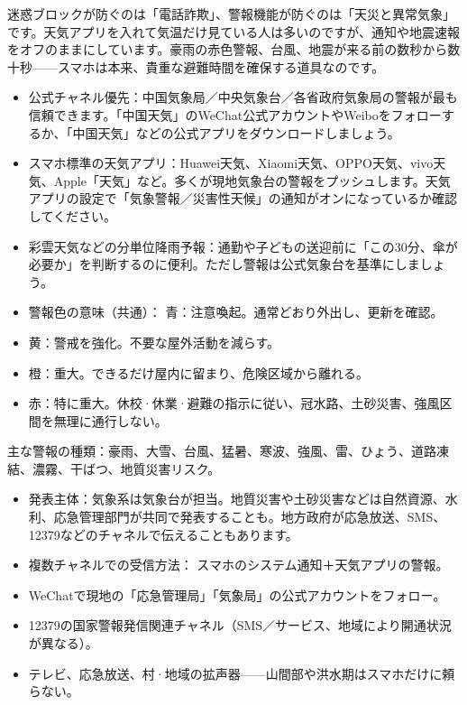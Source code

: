 
迷惑ブロックが防ぐのは「電話詐欺」、警報機能が防ぐのは「天災と異常気象」です。天気アプリを入れて気温だけ見ている人は多いのですが、通知や地震速報をオフのままにしています。豪雨の赤色警報、台風、地震が来る前の数秒から数十秒——スマホは本来、貴重な避難時間を確保する道具なのです。


\begin{itemize}
  \item 公式チャネル優先：中国気象局／中央気象台／各省政府気象局の警報が最も信頼できます。「中国天気」のWeChat公式アカウントやWeiboをフォローするか、「中国天気」などの公式アプリをダウンロードしましょう。
  \item スマホ標準の天気アプリ：Huawei天気、Xiaomi天気、OPPO天気、vivo天気、Apple「天気」など。多くが現地気象台の警報をプッシュします。天気アプリの設定で「気象警報／災害性天候」の通知がオンになっているか確認してください。
  \item 彩雲天気などの分単位降雨予報：通勤や子どもの送迎前に「この30分、傘が必要か」を判断するのに便利。ただし警報は公式気象台を基準にしましょう。
  \item 警報色の意味（共通）： 青：注意喚起。通常どおり外出し、更新を確認。
  \item 黄：警戒を強化。不要な屋外活動を減らす。
  \item 橙：重大。できるだけ屋内に留まり、危険区域から離れる。
  \item 赤：特に重大。休校·休業·避難の指示に従い、冠水路、土砂災害、強風区間を無理に通行しない。
\end{itemize}

主な警報の種類：豪雨、大雪、台風、猛暑、寒波、強風、雷、ひょう、道路凍結、濃霧、干ばつ、地質災害リスク。


\begin{itemize}
  \item 発表主体：気象系は気象台が担当。地質災害や土砂災害などは自然資源、水利、応急管理部門が共同で発表することも。地方政府が応急放送、SMS、12379などのチャネルで伝えることもあります。
  \item 複数チャネルでの受信方法： スマホのシステム通知＋天気アプリの警報。
  \item WeChatで現地の「応急管理局」「気象局」の公式アカウントをフォロー。
  \item 12379の国家警報発信関連チャネル（SMS／サービス、地域により開通状況が異なる）。
  \item テレビ、応急放送、村·地域の拡声器——山間部や洪水期はスマホだけに頼らない。
\end{itemize}

